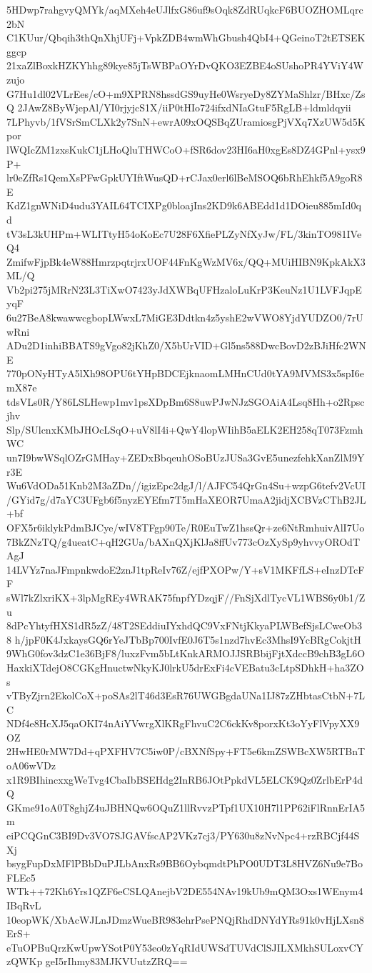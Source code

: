 5HDwp7rahgvyQMYk/aqMXeh4eUJlfxG86uf9sOqk8ZdRUqkcF6BUOZHOMLqrc2bN
C1KUur/Qbqih3thQnXhjUFj+VpkZDB4wmWhGbush4QbI4+QGeinoT2tETSEKggcp
21xaZlBoxkHZKYhhg89kye85jTsWBPaOYrDvQKO3EZBE4oSUshoPR4YViY4Wzujo
G7Hu1dl02VLrEes/cO+m9XPRN8hssdGS9uyHe0WsryeDy8ZYMaShlzr/BHxc/ZsQ
2JAwZ8ByWjepAl/YI0rjyjcS1X/iiP0tHIo724ifxdNIaGtuF5RgLB+ldmldqyii
7LPhyvb/1fVSrSmCLXk2y7SnN+ewrA09xOQSBqZUramiosgPjVXq7XzUW5d5Kpor
lWQIcZM1zxsKukC1jLHoQluTHWCoO+fSR6dov23HI6aH0xgEs8DZ4GPnl+ysx9P+
lr0eZfRs1QemXsPFwGpkUYIftWusQD+rCJax0erl6lBeMSOQ6bRhEhkf5A9goR8E
KdZ1gnWNiD4udu3YAIL64TCIXPg0bloajIns2KD9k6ABEdd1d1DOieu885mId0qd
tV3sL3kUHPm+WLITtyH54oKoEc7U28F6XfiePLZyNfXyJw/FL/3kinTO981IVeQ4
ZmifwFjpBk4eW88HmrzpqtrjrxUOF44FnKgWzMV6x/QQ+MUiHIBN9KpkAkX3ML/Q
Vb2pi275jMRrN23L3TiXwO7423yJdXWBqUFHzaloLuKrP3KeuNz1U1LVFJqpEyqF
6u27BeA8kwawwcgbopLWwxL7MiGE3Ddtkn4z5yshE2wVWO8YjdYUDZO0/7rUwRni
ADu2D1inhiBBATS9gVgo82jKhZ0/X5bUrVID+Gl5ns588DwcBovD2zBJiHfc2WNE
770pONyHTyA5lXh98OPU6tYHpBDCEjknaomLMHnCUd0tYA9MVMS3x5spI6emX87e
tdsVLs0R/Y86LSLHewp1mv1psXDpBm6S8uwPJwNJzSGOAiA4Lsq8Hh+o2Rpscjhv
Slp/SUlcnxKMbJHOcLSqO+uV8lI4i+QwY4lopWIihB5aELK2EH258qT073FzmhWC
un7I9bwWSqlOZrGMHay+ZEDxBbqeuhOSoBUzJUSa3GvE5unezfehkXanZlM9Yr3E
Wu6VdODa51Knb2M3aZDn//igizEpc2dgJ/l/AJFC54QrGn4Su+wzpG6tefv2VcUI
/GYid7g/d7aYC3UFgb6f5nyzEYEfm7T5mHaXEOR7UmaA2jidjXCBVzCThB2JL+bf
OFX5r6iklykPdmBJCye/wIV8TFgp90Te/R0EuTwZ1hssQr+ze6NtRmhuivAlI7Uo
7BkZNzTQ/g4ueatC+qH2GUa/bAXnQXjKlJa8ffUv773cOzXySp9yhvvyOROdTAgJ
14LVYz7naJFmpnkwdoE2znJ1tpReIv76Z/ejfPXOPw/Y+sV1MKFfLS+eInzDTcFF
sWl7kZlxriKX+3lpMgREy4WRAK75fnpfYDzqjF//FnSjXdlTycVL1WBS6y0b1/Zu
8dPcYhtyfHXS1dR5zZ/48T2SEddiuIYxhdQC9VxFNtjKkyaPLWBefSjsLCweOb38
h/jpF0K4JxkaysGQ6rYeJTbBp700IvfE0J6T5s1nzd7hvEc3MhsI9YcBRgCokjtH
9WhG0fov3dzC1e36BjF8/luxzFvm5bLtKnkARMOJJSRBbijFjtXdccB9chB3gL6O
HaxkiXTdejO8CGKgHnuctwNkyKJ0lrkU5drExFi4cVEBatu3cLtpSDhkH+ha3ZOs
vTByZjrn2EkolCoX+poSAs2lT46d3EsR76UWGBgdaUNa1IJ87zZHbtasCtbN+7LC
NDf4e8HcXJ5qaOKI74nAiYVwrgXlKRgFhvuC2C6ckKv8porxKt3oYyFlVpyXX9OZ
2HwHE0rMW7Dd+qPXFHV7C5iw0P/cBXNfSpy+FT5e6kmZSWBcXW5RTBnToA06wVDz
x1R9BIhincxxgWeTvg4CbaIbBSEHdg2InRB6JOtPpkdVL5ELCK9Qz0ZrlbErP4dQ
GKme91oA0T8ghjZ4uJBHNQw6OQuZ1llRvvzPTpf1UX10H7l1PP62iFlRnnErIA5m
eiPCQGnC3BI9Dv3VO7SJGAVfscAP2VKz7cj3/PY630u8zNvNpc4+rzRBCjf44SXj
bsygFupDxMFlPBbDuPJLbAnxRs9BB6OybqmdtPhPO0UDT3L8HVZ6Nu9e7BoFLEc5
WTk++72Kh6Yrs1QZF6eCSLQAnejbV2DE554NAv19kUb9mQM3Oxs1WEnym4IBqRvL
10eopWK/XbAcWJLnJDmzWueBR983ehrPsePNQjRhdDNYdYRs91k0vHjLXsn8ErS+
eTuOPBuQrzKwUpwYSotP0Y53eo0zYqRIdUWSdTUVdClSJILXMkhSULoxvCYzQWKp
geI5rIhmy83MJKVUutzZRQ==
